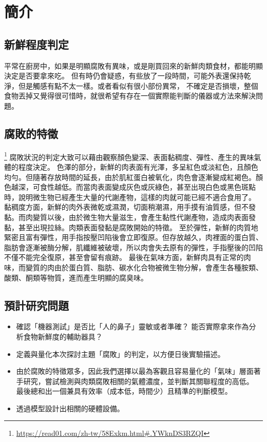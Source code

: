 \chapter{簡介}

\section{新鮮程度判定}
平常在廚房中，如果是明顯腐敗有異味，或是剛買回來的新鮮肉類食材，都能明顯決定是否要拿來吃。
但有時仍會疑惑，有些放了一段時間，可能外表還保持乾淨，但是觸感有點不太一樣。或者看似有很小部份異常，
不確定是否損壞，整個食物丟掉又覺得很可惜時，就很希望有存在一個實際能判斷的儀器或方法來解決問題。

\section{腐敗的特徵}\footnote{\url{https://read01.com/zh-tw/58Exkm.html#.YWknDS3RZQI}}
腐敗狀況的判定大致可以藉由觀察顏色變深、表面黏稠度、彈性、產生的異味氣體的程度決定。
色澤的部分，新鮮的肉表面有光澤，多呈紅色或淡紅色，且顏色均勻。但隨著存放時間的延長，由於肌紅蛋白被氧化，肉色會逐漸變成紅褐色。顏色越深，可食性越低。而當肉表面變成灰色或灰綠色，甚至出現白色或黑色斑點時，說明微生物已經產生大量的代謝產物，這樣的肉就可能已經不適合食用了。
黏稠度方面，新鮮的肉外表微乾或濕潤，切面稍潮濕，用手摸有油質感，但不發黏。而肉變質以後，由於微生物大量滋生，會產生黏性代謝產物，造成肉表面發黏，甚至出現拉絲。肉類表面發黏是腐敗開始的特徵。
至於彈性，新鮮的肉質地緊密且富有彈性，用手指按壓凹陷後會立即復原。但存放越久，肉裡面的蛋白質、脂肪會逐漸被酶分解，肌纖維被破壞，所以肉會失去原有的彈性，手指壓後的凹陷不僅不能完全復原，甚至會留有痕跡。
最後在氣味方面，新鮮肉具有正常的肉味，而變質的肉由於蛋白質、脂肪、碳水化合物被微生物分解，會產生各種胺類、酸類、酮類等物質，進而產生明顯的腐臭味。

\section{預計研究問題}
\begin{itemize}
	\item 確認「機器測試」是否比「人的鼻子」靈敏或者準確？
		能否實際拿來作為分析食物新鮮度的輔助器具？
	\item 定義與量化本次探討主題「腐敗」的判定，以方便日後實驗描述。
	\item 由於腐敗的特徵眾多，因此我們選擇以最為客觀且容易量化的「氣味」層面著手研究，嘗試檢測與肉類腐敗相關的氣體濃度，並判斷其關聯程度的高低。
		最後總和出一個兼具有效率（成本低，時間少）且精準的判斷模型。
	\item 透過模型設計出相關的硬體設備。
\end{itemize}
